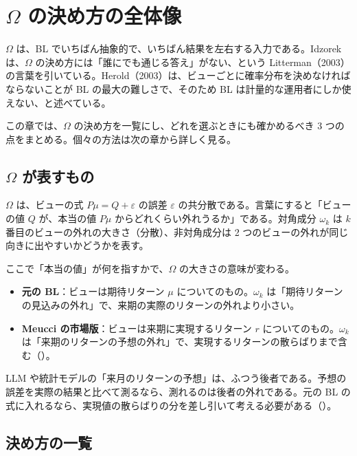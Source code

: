 \chapter{$\Omega$ の決め方の全体像}\label{ch:omega}

$\Omega$ は、BL でいちばん抽象的で、いちばん結果を左右する入力である。Idzorek は、$\Omega$ の決め方には「誰にでも通じる答え」がない、という Litterman（2003）の言葉を引いている。Herold（2003）は、ビューごとに確率分布を決めなければならないことが BL の最大の難しさで、そのため BL は計量的な運用者にしか使えない、と述べている。

この章では、$\Omega$ の決め方を一覧にし、どれを選ぶときにも確かめるべき 3 つの点をまとめる。個々の方法は次の章から詳しく見る。

\section{$\Omega$ が表すもの}

$\Omega$ は、ビューの式 $P\mu=Q+\varepsilon$ の誤差 $\varepsilon$ の共分散である。言葉にすると「ビューの値 $Q$ が、本当の値 $P\mu$ からどれくらい外れうるか」である。対角成分 $\omega_k$ は $k$ 番目のビューの外れの大きさ（分散）、非対角成分は 2 つのビューの外れが同じ向きに出やすいかどうかを表す。

ここで「本当の値」が何を指すかで、$\Omega$ の大きさの意味が変わる。

\begin{itemize}
\item \textbf{元の BL}：ビューは期待リターン $\mu$ についてのもの。$\omega_k$ は「期待リターンの見込みの外れ」で、来期の実際のリターンの外れより小さい。
\item \textbf{Meucci の市場版}：ビューは来期に実現するリターン $r$ についてのもの。$\omega_k$ は「来期のリターンの予想の外れ」で、実現するリターンの散らばりまで含む（）。
\end{itemize}

LLM や統計モデルの「来月のリターンの予想」は、ふつう後者である。予想の誤差を実際の結果と比べて測るなら、測れるのは後者の外れである。元の BL の式に入れるなら、実現値の散らばりの分を差し引いて考える必要がある（）。

\section{決め方の一覧}

